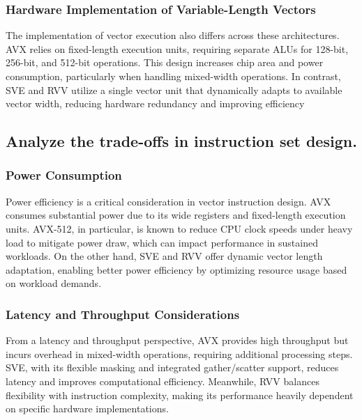 \documentclass[conference]{IEEEtran}
\begin{document}
\subsubsection{Hardware Implementation of Variable-Length Vectors}

The implementation of vector execution also differs across these architectures. AVX relies on fixed-length execution units, requiring separate ALUs for 128-bit, 256-bit, and 512-bit operations. This design increases chip area and power consumption, particularly when handling mixed-width operations\cite{b14}. In contrast, SVE and RVV utilize a single vector unit that dynamically adapts to available vector width, reducing hardware redundancy and improving efficiency\cite{b16}

\subsection{ Analyze the trade-offs in instruction set design.}
\subsubsection{Power Consumption}

Power efficiency is a critical consideration in vector instruction design. AVX consumes substantial power due to its wide registers and fixed-length execution units. AVX-512, in particular, is known to reduce CPU clock speeds under heavy load to mitigate power draw, which can impact performance in sustained workloads\cite{b14}. On the other hand, SVE and RVV offer dynamic vector length adaptation, enabling better power efficiency by optimizing resource usage based on workload demands\cite{b15}.

\subsubsection{Latency and Throughput Considerations}

From a latency and throughput perspective, AVX provides high throughput but incurs overhead in mixed-width operations, requiring additional processing steps\cite{b12}. SVE, with its flexible masking and integrated gather/scatter support, reduces latency and improves computational efficiency\cite{b16}. Meanwhile, RVV balances flexibility with instruction complexity, making its performance heavily dependent on specific hardware implementations\cite{b17}.

\end{document}
